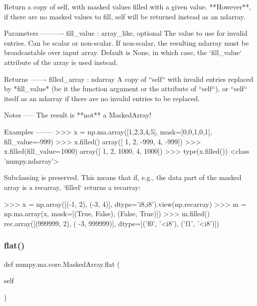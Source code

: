 \begin{DoxyVerb}Return a copy of self, with masked values filled with a given value.
**However**, if there are no masked values to fill, self will be
returned instead as an ndarray.

Parameters
----------
fill_value : array_like, optional
    The value to use for invalid entries. Can be scalar or non-scalar.
    If non-scalar, the resulting ndarray must be broadcastable over
    input array. Default is None, in which case, the `fill_value`
    attribute of the array is used instead.

Returns
-------
filled_array : ndarray
    A copy of ``self`` with invalid entries replaced by *fill_value*
    (be it the function argument or the attribute of ``self``), or
    ``self`` itself as an ndarray if there are no invalid entries to
    be replaced.

Notes
-----
The result is **not** a MaskedArray!

Examples
--------
>>> x = np.ma.array([1,2,3,4,5], mask=[0,0,1,0,1], fill_value=-999)
>>> x.filled()
array([   1,    2, -999,    4, -999])
>>> x.filled(fill_value=1000)
array([   1,    2, 1000,    4, 1000])
>>> type(x.filled())
<class 'numpy.ndarray'>

Subclassing is preserved. This means that if, e.g., the data part of
the masked array is a recarray, `filled` returns a recarray:

>>> x = np.array([(-1, 2), (-3, 4)], dtype='i8,i8').view(np.recarray)
>>> m = np.ma.array(x, mask=[(True, False), (False, True)])
>>> m.filled()
rec.array([(999999,      2), (    -3, 999999)],
  dtype=[('f0', '<i8'), ('f1', '<i8')])
\end{DoxyVerb}
 \mbox{\label{classnumpy_1_1ma_1_1core_1_1MaskedArray_a2f29d009ef7274dd5e3e471454cbd017}} 
\subsubsection{\texorpdfstring{flat()}{flat()}\hspace{0.1cm}{\footnotesize\ttfamily [1/2]}}
{\footnotesize\ttfamily def numpy.\+ma.\+core.\+Masked\+Array.\+flat (\begin{DoxyParamCaption}\item[{}]{self }\end{DoxyParamCaption})}

